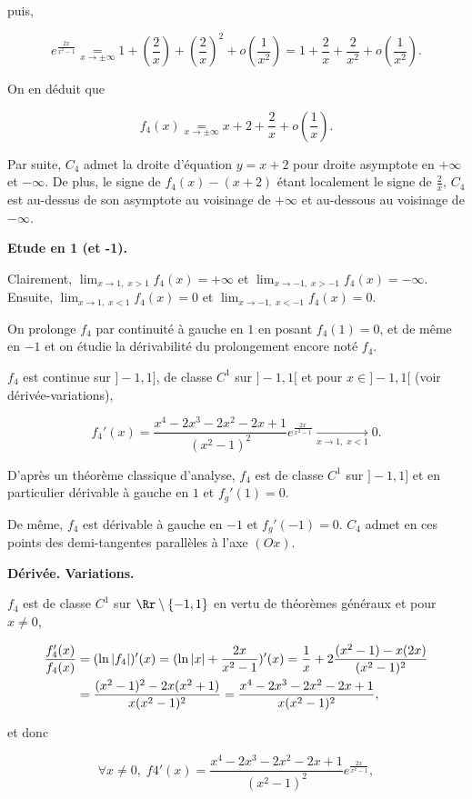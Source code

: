 {\begin{enumerate}
{{{{puis,

$$e^{\frac{2x}{x^2-1}}\underset{x\rightarrow\pm\infty}{=}1+(\frac{2}{x})+(\frac{2}{x})^2+ o(\frac{1}{x^2})=1+\frac{2}{x}+\frac{2}{x^2}+ o(\frac{1}{x^2}).$$

On en déduit que

$$f_4(x)\underset{x\rightarrow\pm\infty}{=}x+2+\frac{2}{x}+o(\frac{1}{x}).$$

Par suite, $C_4$ admet la droite d'équation $y=x+2$ pour droite asymptote en $+\infty$ et $-\infty$. De plus, le signe de $f_4(x)-(x+2)$ étant localement le signe de $\frac{2}{x}$, $C_4$ est au-dessus de son asymptote au voisinage de $+\infty$ et au-dessous au voisinage de $-\infty$.

\textbf{Etude en 1 (et -1).}

Clairement, $\lim_{x\rightarrow 1,\;x>1}f_4(x)=+\infty$ et $\lim_{x\rightarrow -1,\;x>-1}f_4(x)=-\infty$. Ensuite, $\lim_{x\rightarrow 1,\;x<1}f_4(x)=0$ et $\lim_{x\rightarrow -1,\;x<-1}f_4(x)=0$.

On prolonge $f_4$ par continuité à gauche en $1$ en posant $f_4(1)=0$, et de même en $-1$ et on étudie la dérivabilité du prolongement encore noté $f_4$.

$f_4$ est continue sur $]-1,1]$, de classe $C^1$ sur $]-1,1[$ et pour $x\in]-1,1[$ (voir dérivée-variations), 

$$f_4'(x)=\frac{x^4-2x^3-2x^2-2x+1}{(x^2-1)^2}e^{\frac{2x}{x^2-1}}\underset{x\rightarrow1,\;x<1}{\rightarrow}0.$$

D'après un théorème classique d'analyse, $f_4$ est de classe $C^1$ sur $]-1,1]$ et en particulier dérivable à gauche en $1$ et $f_g'(1)=0$.

De même, $f_4$ est dérivable à gauche en $-1$ et $f_g'(-1)=0$. $C_4$ admet en ces points des demi-tangentes parallèles à l'axe $(Ox)$.

\textbf{Dérivée. Variations.}

$f_4$ est de classe $C^1$ sur $\Rr\setminus\{-1,1\}$ en vertu de théorèmes généraux et pour $x\neq 0$,

\begin{align*}\ensuremath
\frac{f_4'(x)}{f_4(x)}&=(\ln|f_4|)'(x)=(\ln|x|+\frac{2x}{x^2-1})'(x)=\frac{1}{x}+2\frac{(x^2-1)-x(2x)}{(x^2-1)^2}\\
 &=\frac{(x^2-1)^2-2x(x^2+1)}{x(x^2-1)^2}=\frac{x^4-2x^3-2x^2-2x+1}{x(x^2-1)^2},
\end{align*}
 
et donc 

$$\forall x\neq 0,\;f4'(x)=\frac{x^4-2x^3-2x^2-2x+1}{(x^2-1)^2}e^{\frac{2x}{x^2-1}},$$

}}}}
\end{enumerate}}
